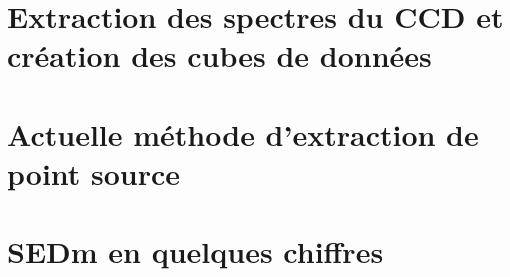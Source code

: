 \documentclass[../main/main.tex]{subfiles}
\begin{document}
\section{Extraction des spectres du CCD et création des cubes de données}

\section{Actuelle méthode d'extraction de point source}

\section{SEDm en quelques chiffres}



\end{document}
